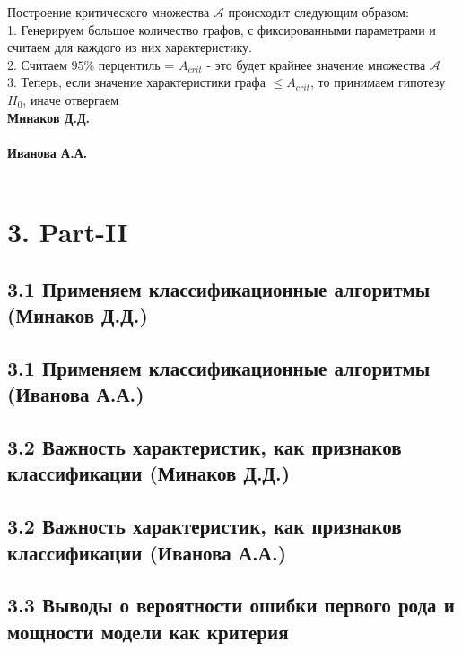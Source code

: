 \documentclass[12pt]{article}
\begin{document}
\noindent Построение критического множества $\mathcal{A}$ происходит следующим образом:\\
1. Генерируем большое количество графов, с фиксированными параметрами и считаем для каждого из них характеристику.\\
2. Считаем $95\%$ перцентиль = $A_{crit}$ - это будет крайнее значение множества $\mathcal{A}$ \\
3. Теперь, если значение характеристики графа $\leq A_{crit}$, то принимаем гипотезу $H_0$, иначе отвергаем\\

\vspace{5pt}
\noindent \textbf{Минаков Д.Д.}\\\\

    
\vspace{10pt}
\noindent \textbf{Иванова А.А.}\\\\

\newpage

\section*{3. Part-II}
\subsection*{3.1 Применяем классификационные алгоритмы (Минаков Д.Д.)}


\subsection*{3.1 Применяем классификационные алгоритмы (Иванова А.А.)}


\subsection*{3.2 Важность характеристик, как признаков классификации (Минаков Д.Д.)}

\newpage
\subsection*{3.2 Важность характеристик, как признаков классификации (Иванова А.А.)}

\newpage

\subsection*{3.3 Выводы о вероятности ошибки первого рода и мощности модели как критерия}


        
\end{document}
